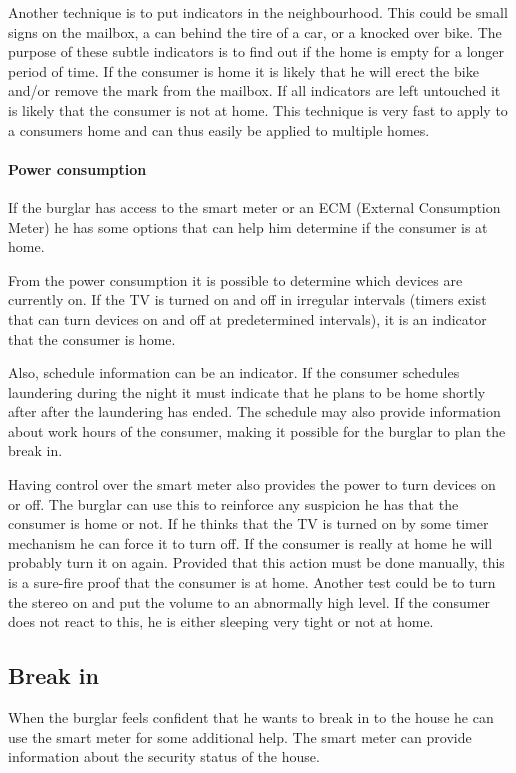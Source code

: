 Another technique is to put indicators in the neighbourhood.
This could be small signs on the mailbox, a can behind the tire of a car, or a knocked over bike.
The purpose of these subtle indicators is to find out if the home is empty for a longer period of time.
If the consumer is home it is likely that he will erect the bike and/or remove the mark from the mailbox.
If all indicators are left untouched it is likely that the consumer is not at home.
This technique is very fast to apply to a consumers home and can thus easily be applied to multiple homes.

\paragraph{Power consumption}
If the burglar has access to the smart meter or an ECM (External Consumption Meter) he has some options that can help him determine if the consumer is at home.

From the power consumption it is possible to determine which devices are currently on. 
If the TV is turned on and off in irregular intervals (timers exist that can turn devices on and off at predetermined intervals), it is an indicator that the consumer is home.

Also, schedule information can be an indicator.
If the consumer schedules laundering during the night it must indicate that he plans to be home shortly after after the laundering has ended.
The schedule may also provide information about work hours of the consumer, making it possible for the burglar to plan the break in.

Having control over the smart meter also provides the power to turn devices on or off.
The burglar can use this to reinforce any suspicion he has that the consumer is home or not.
If he thinks that the TV is turned on by some timer mechanism he can force it to turn off.
If the consumer is really at home he will probably turn it on again.
Provided that this action must be done manually, this is a sure-fire proof that the consumer is at home.
Another test could be to turn the stereo on and put the volume to an abnormally high level.
If the consumer does not react to this, he is either sleeping very tight or not at home.

\subsection{Break in}
When the burglar feels confident that he wants to break in to the house he can use the smart meter for some additional help.
The smart meter can provide information about the security status of the house.

